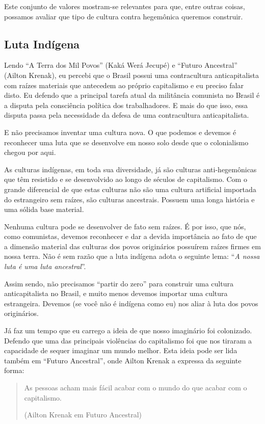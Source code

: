 Este conjunto de valores mostram-se relevantes para que, entre outras coisas, possamos avaliar que tipo de cultura contra hegemônica queremos construir.

\subsection{Luta Indígena}

Lendo “A Terra dos Mil Povos” (Kaká Werá Jecupé) e “Futuro Ancestral” (Ailton Krenak), eu percebi que o Brasil possui uma contracultura anticapitalista com raízes materiais que antecedem ao próprio capitalismo e eu preciso falar disto. Eu defendo que a principal tarefa atual da militância comunista no Brasil é a disputa pela consciência política dos trabalhadores. E mais do que isso, essa disputa passa pela necessidade da defesa de uma contracultura anticapitalista.

E não precisamos inventar uma cultura nova. O que podemos e devemos é reconhecer uma luta que se desenvolve em nosso solo desde que o colonialismo chegou por aqui.

As culturas indígenas, em toda sua diversidade, já são culturas anti-hegemônicas que têm resistido e se desenvolvido ao longo de séculos de capitalismo. Com o grande diferencial de que estas culturas não são uma cultura artificial importada do estrangeiro sem raízes, são culturas ancestrais. Possuem uma longa história e uma sólida base material.

Nenhuma cultura pode se desenvolver de fato sem raízes. É por isso, que nós, como comunistas, devemos reconhecer e dar a devida importância ao fato de que a dimensão material das culturas dos povos originários possuírem raízes firmes em nossa terra. Não é sem razão que a luta indígena adota o seguinte lema: “\textit{A nossa luta é uma luta ancestral}”.

Assim sendo, não precisamos “partir do zero” para construir uma cultura anticapitalista no Brasil, e muito menos devemos importar uma cultura estrangeira. Devemos (se você não é indígena como eu) nos aliar à luta dos povos originários.

Já faz um tempo que eu carrego a ideia de que nosso imaginário foi colonizado. Defendo que uma das principais violências do capitalismo foi que nos tiraram a capacidade de sequer imaginar um mundo melhor. Esta ideia pode ser lida também em “Futuro Ancestral”, onde Ailton Krenak a expressa da seguinte forma:

\begin{quote}
As pessoas acham mais fácil acabar com o mundo do que acabar com o capitalismo.

(Ailton Krenak em Futuro Ancestral)
\end{quote}

